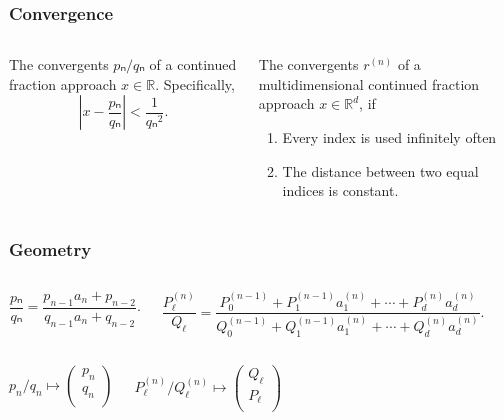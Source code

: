 \documentclass[aspectratio=169]{beamer}
\begin{document}
\begin{frame}
  \frametitle{Convergence}
  \small
  \begin{columns}[T]
    \begin{theorem}
      The convergents $pₙ/qₙ$ of a continued fraction approach $x ∈ ℝ$.
      Specifically,
      \[
        \left|x - \frac{pₙ}{qₙ}\right| < \frac{1}{qₙ^2}.
      \]
    \end{theorem}

    \begin{theorem}
      The convergents $r^{(n)}$ of a multidimensional continued fraction approach $x ∈ ℝ^d$, if
      \begin{enumerate}
        \item Every index is used infinitely often
        \item The distance between two equal indices is constant.
      \end{enumerate}
    \end{theorem}
  \end{columns}
\end{frame}

\begin{frame}
  \frametitle{Geometry}
  \small

  \begin{columns}
    \begin{lemma}
      \[
        \frac{pₙ}{qₙ} = \frac{p_{n-1} a_n + p_{n-2}}{q_{n-1} a_n + q_{n-2}}.
      \]
    \end{lemma}

    \begin{lemma}
      \[
        \frac{P_ℓ^{(n)}}{Q_ℓ}
        = \frac{P_0^{(n-1)} + P_1^{(n-1)} a_1^{(n)} + ⋯ + P_d^{(n)} a_d^{(n)}}
               {Q_0^{(n-1)} + Q_1^{(n-1)} a_1^{(n)} + ⋯ + Q_d^{(n)} a_d^{(n)}}.
      \]
    \end{lemma}
  \end{columns}

  \begin{columns}
    \[
      p_n/q_n ↦ \begin{pmatrix}
        p_n \\
        q_n \\
      \end{pmatrix}
    \]

    \[
      P_ℓ^{(n)}/Q_ℓ^{(n)} ↦ \begin{pmatrix}
        Q_ℓ \\
        P_ℓ \\
      \end{pmatrix}
    \]
  \end{columns}
\end{frame}
\end{document}
